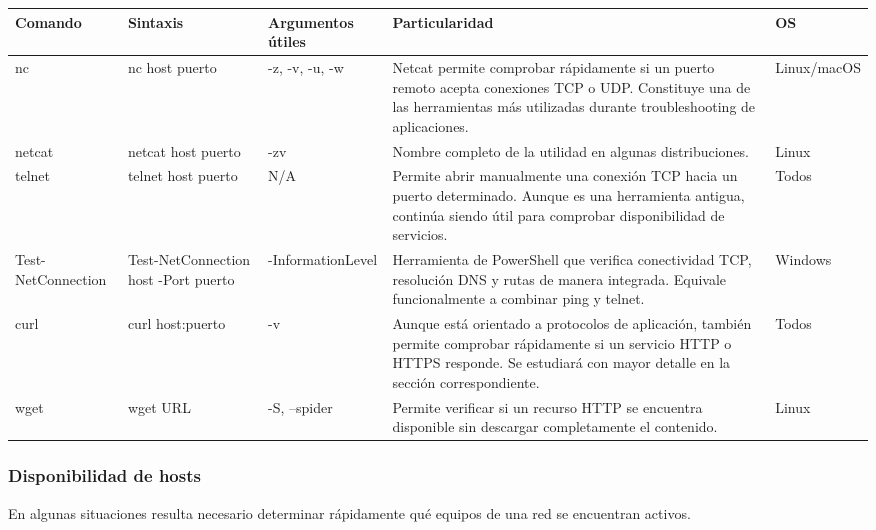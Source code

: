\documentclass[a4paper,10pt]{article}
\begin{document}
\begin{longtable}{|p{2.8cm}|p{3cm}|p{4cm}|p{5.6cm}|p{1.5cm}|}

\hline
Comando &
Sintaxis &
Argumentos útiles &
Particularidad &
OS
\\
\hline
\endhead

nc &
nc host puerto &
-z, -v, -u, -w &
Netcat permite comprobar rápidamente si un puerto remoto acepta conexiones TCP o UDP. Constituye una de las herramientas más utilizadas durante troubleshooting de aplicaciones. &
Linux/macOS
\\
\hline

netcat &
netcat host puerto &
-zv &
Nombre completo de la utilidad en algunas distribuciones. &
Linux
\\
\hline

telnet &
telnet host puerto &
N/A &
Permite abrir manualmente una conexión TCP hacia un puerto determinado. Aunque es una herramienta antigua, continúa siendo útil para comprobar disponibilidad de servicios. &
Todos
\\
\hline

Test-NetConnection &
Test-NetConnection host -Port puerto &
-InformationLevel &
Herramienta de PowerShell que verifica conectividad TCP, resolución DNS y rutas de manera integrada. Equivale funcionalmente a combinar ping y telnet. &
Windows
\\
\hline

curl &
curl host:puerto &
-v &
Aunque está orientado a protocolos de aplicación, también permite comprobar rápidamente si un servicio HTTP o HTTPS responde. Se estudiará con mayor detalle en la sección correspondiente. &
Todos
\\
\hline

wget &
wget URL &
-S, --spider &
Permite verificar si un recurso HTTP se encuentra disponible sin descargar completamente el contenido. &
Linux
\\
\hline

\end{longtable}



\subsubsection{Disponibilidad de hosts}

En algunas situaciones resulta necesario determinar rápidamente qué equipos de
una red se encuentran activos.
\end{document}
